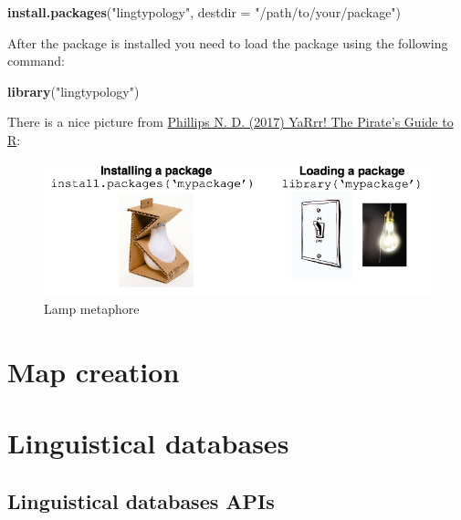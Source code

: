 \documentclass[]{book}
\newenvironment{Shaded}{\begin{snugshade}}{\end{snugshade}}
\newcommand{\KeywordTok}[1]{\textcolor[rgb]{0.13,0.29,0.53}{\textbf{#1}}}
\newcommand{\DataTypeTok}[1]{\textcolor[rgb]{0.13,0.29,0.53}{#1}}
\newcommand{\StringTok}[1]{\textcolor[rgb]{0.31,0.60,0.02}{#1}}
\newcommand{\NormalTok}[1]{#1}
\theoremstyle{definition}
\theoremstyle{definition}
\theoremstyle{definition}
\theoremstyle{remark}
\begin{document}
\begin{Shaded}
\begin{Highlighting}[]
\KeywordTok{install.packages}\NormalTok{(}\StringTok{"lingtypology"}\NormalTok{,}
                 \DataTypeTok{destdir =} \StringTok{"/path/to/your/package"}\NormalTok{)}
\end{Highlighting}
\end{Shaded}

After the package is installed you need to load the package using the
following command:

\begin{Shaded}
\begin{Highlighting}[]
\KeywordTok{library}\NormalTok{(}\StringTok{"lingtypology"}\NormalTok{)}
\end{Highlighting}
\end{Shaded}

There is a nice picture from
\href{https://bookdown.org/ndphillips/YaRrr/}{Phillips N. D. (2017)
YaRrr! The Pirate's Guide to R}:

\begin{figure}

{\centering \includegraphics[width=6.89in]{images/02-package} 

}

\caption{Lamp metaphore}\label{fig:lamp}
\end{figure}

\chapter{Map creation}\label{map-creation}

\chapter{Linguistical databases}\label{db}

\section{Linguistical databases APIs}\label{api}
\end{document}
